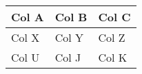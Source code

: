 \begin{tabular}{|l|l|l|}
\hline
Col A & Col B & Col C \\
\hline
Col X & Col Y & Col Z \\
\hline
Col U & Col J & Col K \\
\hline

\end{tabular}
